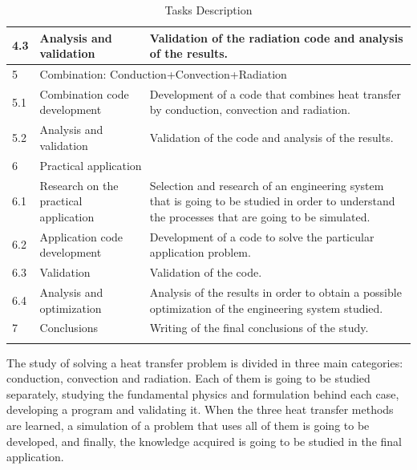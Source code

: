 \begin{longtable}{ | p{1.3cm} | p{3cm} | p{11cm} |}
4.3 & Analysis and validation &  Validation of the radiation code and analysis of the results. \\ \hline
5 & \multicolumn{2}{|l|}{Combination: Conduction+Convection+Radiation} \\ \hline
5.1 & Combination code development & Development of a code that combines heat transfer by conduction, convection and radiation. \\ \hline
5.2 & Analysis and validation &  Validation of the code and analysis of the results. \\ \hline
6 & \multicolumn{2}{|l|}{Practical application} \\ \hline
6.1 & Research on the practical application & Selection and research of an engineering system that is going to be studied in order to understand the processes that are going to be simulated. \\ \hline
6.2 & Application code development & Development of a code to solve the particular application problem. \\ \hline
6.3 & Validation &  Validation of the code. \\ \hline
6.4 & Analysis and optimization &  Analysis of the results in order to obtain a possible optimization of the engineering system studied. \\ \hline
7 & Conclusions & Writing of the final conclusions of the study. \\ \hline
\caption{Tasks Description}
\label{taskssummary}
\end{longtable}
The study of solving a heat transfer problem is divided in three main categories: conduction, convection and radiation. Each of them is going to be studied separately, studying the fundamental physics and formulation behind each case, developing a program and validating it. When the three heat transfer methods are learned, a simulation of a problem that uses all of them is going to be developed, and finally, the knowledge acquired is going to be studied in the final application.

